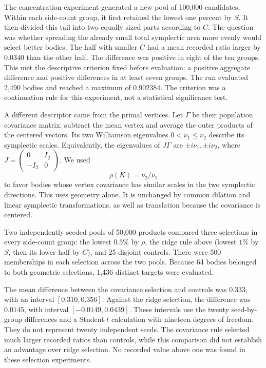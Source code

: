 The concentration experiment generated a new pool of 100,000 candidates.
Within each side-count group, it first retained the lowest one percent by
$S$. It then divided this tail into two equally sized parts according to
$C$. The question was whether spreading the already small total symplectic
area more evenly would select better bodies. The half with smaller $C$ had a
mean recorded ratio larger by $0.0340$ than the other half. The difference
was positive in eight of the ten groups. This met the descriptive criterion
fixed before evaluation: a positive aggregate difference and positive
differences in at least seven groups. The run evaluated 2,490 bodies and
reached a maximum of $0.902384$. The criterion was a continuation rule for
this experiment, not a statistical significance test.

A different descriptor came from the primal vertices. Let $\Gamma$ be their
population covariance matrix: subtract the mean vertex and average the outer
products of the centered vectors. Its two Williamson eigenvalues
$0<\nu_1\leq\nu_2$ describe its symplectic scales. Equivalently, the eigenvalues
of $J\Gamma$ are $\pm i\nu_1,\pm i\nu_2$, where
$J=\begin{pmatrix}0&I_2\\-I_2&0\end{pmatrix}$.
We used
\[
 \rho(K)=\nu_2/\nu_1
\]
to favor bodies whose vertex covariance has similar scales in the two
symplectic directions. This uses geometry alone. It is unchanged by common
dilation and linear symplectic transformations, as well as translation
because the covariance is centered.

Two independently seeded pools of 50,000 products compared three selections
in every side-count group: the lowest $0.5\%$ by $\rho$, the ridge rule above
(lowest $1\%$ by $S$, then its lower half by $C$), and 25 disjoint controls.
There were 500 memberships in each selection across the two pools. Because
64 bodies belonged to both geometric selections, 1,436 distinct targets
were evaluated.

The mean difference between the covariance selection and controls was
$0.333$, with an interval $[0.310,0.356]$. Against the ridge selection, the
difference was $0.0145$, with interval $[-0.0149,0.0439]$. These intervals
use the twenty seed-by-group differences and a Student-$t$ calculation with
nineteen degrees of freedom. They do not represent twenty independent seeds.
The covariance rule selected much larger recorded ratios than controls,
while this comparison did not establish an advantage over ridge selection.
No recorded value above one was found in these selection experiments.

